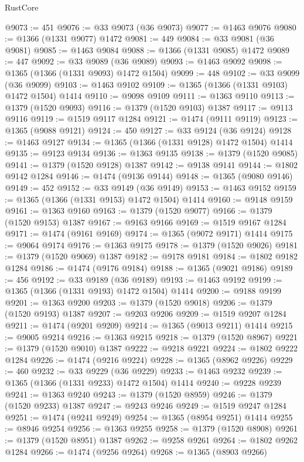 \begin{lexlean}{RustCore}
\begin{coremodule}
@9073 := 451
@9076 := @33 @9073 (@36 @9073)
@9077 := @1463 @9076
@9080 := @1366 (@1331 @9077) @1472
@9081 := 449
@9084 := @33 @9081 (@36 @9081)
@9085 := @1463 @9084
@9088 := @1366 (@1331 @9085) @1472
@9089 := 447
@9092 := @33 @9089 (@36 @9089)
@9093 := @1463 @9092
@9098 := @1365 (@1366 (@1331 @9093) @1472 @1504)
@9099 := 448
@9102 := @33 @9099 (@36 @9099)
@9103 := @1463 @9102
@9109 := @1365 (@1366 (@1331 @9103) @1472 @1504) @1414
@9110 := @9098 @9109
@9111 := @1363 @9110
@9113 := @1379 (@1520 @9093)
@9116 := @1379 (@1520 @9103) @1387
@9117 := @9113 @9116
@9119 := @1519 @9117 @1284
@9121 := @1474 (@9111 @9119)
@9123 := @1365 (@9088 @9121)
@9124 := 450
@9127 := @33 @9124 (@36 @9124)
@9128 := @1463 @9127
@9134 := @1365 (@1366 (@1331 @9128) @1472 @1504) @1414
@9135 := @9123 @9134
@9136 := @1363 @9135
@9138 := @1379 (@1520 @9085)
@9141 := @1379 (@1520 @9128) @1387
@9142 := @9138 @9141
@9144 := @1802 @9142 @1284
@9146 := @1474 (@9136 @9144)
@9148 := @1365 (@9080 @9146)
@9149 := 452
@9152 := @33 @9149 (@36 @9149)
@9153 := @1463 @9152
@9159 := @1365 (@1366 (@1331 @9153) @1472 @1504) @1414
@9160 := @9148 @9159
@9161 := @1363 @9160
@9163 := @1379 (@1520 @9077)
@9166 := @1379 (@1520 @9153) @1387
@9167 := @9163 @9166
@9169 := @1519 @9167 @1284
@9171 := @1474 (@9161 @9169)
@9174 := @1365 (@9072 @9171) @1414
@9175 := @9064 @9174
@9176 := @1363 @9175
@9178 := @1379 (@1520 @9026)
@9181 := @1379 (@1520 @9069) @1387
@9182 := @9178 @9181
@9184 := @1802 @9182 @1284
@9186 := @1474 (@9176 @9184)
@9188 := @1365 (@9021 @9186)
@9189 := 456
@9192 := @33 @9189 (@36 @9189)
@9193 := @1463 @9192
@9199 := @1365 (@1366 (@1331 @9193) @1472 @1504) @1414
@9200 := @9188 @9199
@9201 := @1363 @9200
@9203 := @1379 (@1520 @9018)
@9206 := @1379 (@1520 @9193) @1387
@9207 := @9203 @9206
@9209 := @1519 @9207 @1284
@9211 := @1474 (@9201 @9209)
@9214 := @1365 (@9013 @9211) @1414
@9215 := @9005 @9214
@9216 := @1363 @9215
@9218 := @1379 (@1520 @8967)
@9221 := @1379 (@1520 @9010) @1387
@9222 := @9218 @9221
@9224 := @1802 @9222 @1284
@9226 := @1474 (@9216 @9224)
@9228 := @1365 (@8962 @9226)
@9229 := 460
@9232 := @33 @9229 (@36 @9229)
@9233 := @1463 @9232
@9239 := @1365 (@1366 (@1331 @9233) @1472 @1504) @1414
@9240 := @9228 @9239
@9241 := @1363 @9240
@9243 := @1379 (@1520 @8959)
@9246 := @1379 (@1520 @9233) @1387
@9247 := @9243 @9246
@9249 := @1519 @9247 @1284
@9251 := @1474 (@9241 @9249)
@9254 := @1365 (@8954 @9251) @1414
@9255 := @8946 @9254
@9256 := @1363 @9255
@9258 := @1379 (@1520 @8908)
@9261 := @1379 (@1520 @8951) @1387
@9262 := @9258 @9261
@9264 := @1802 @9262 @1284
@9266 := @1474 (@9256 @9264)
@9268 := @1365 (@8903 @9266)

\end{coremodule}
\end{lexlean}
